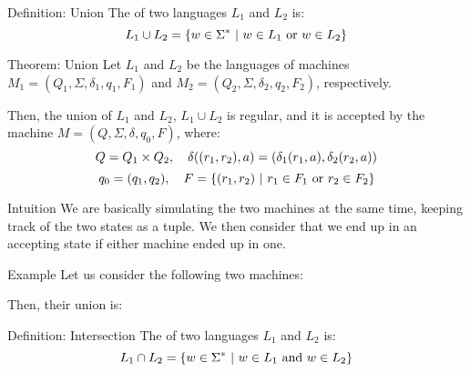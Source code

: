 \documentclass[a4paper]{article}
\begin{document}
\begin{parag}{Definition: Union}
    The  of two languages $L_1$ and $L_2$ is: 
    \[L_1 \cup L_2 = \left\{w \in \Sigma^* \suchthat w \in L_1 \text{ or } w \in L_2\right\}\]
\end{parag}

\begin{parag}{Theorem: Union}
    Let $L_1$ and $L_2$ be the languages of machines $M_1 = \left(Q_1, \Sigma, \delta_1, q_1, F_1\right)$ and $M_2 = \left(Q_2, \Sigma, \delta_2, q_2, F_2\right)$, respectively.

    Then, the union of $L_1$ and $L_2$, $L_1 \cup L_2$ is regular, and it is accepted by the machine $M = \left(Q, \Sigma, \delta, q_0, F\right)$, where: 
    \[Q = Q_1 \times Q_2, \mathspace \delta\left(\left(r_1, r_2\right), a\right) = \left(\delta_1\left(r_1, a\right), \delta_2\left(r_2, a\right)\right)\]
    \[q_0 = \left(q_1, q_2\right), \mathspace F = \left\{\left(r_1, r_2\right) \suchthat r_1 \in F_1 \text{ or } r_2 \in F_2\right\}\]

    \begin{subparag}{Intuition}
        We are basically simulating the two machines at the same time, keeping track of the two states as a tuple. We then consider that we end up in an accepting state if either machine ended up in one.
    \end{subparag}

    \begin{subparag}{Example}
        Let us consider the following two machines:

        Then, their union is:
    \end{subparag}
\end{parag}

\begin{parag}{Definition: Intersection}
    The  of two languages $L_1$ and $L_2$ is: 
    \[L_1 \cap L_2 = \left\{w \in \Sigma^* \suchthat w \in L_1 \text{ and } w \in L_2\right\}\]
\end{parag}
\end{document}
